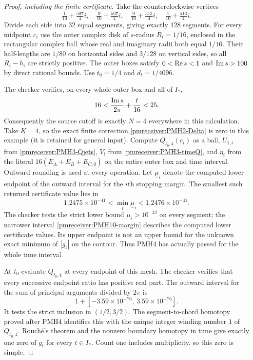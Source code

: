 \documentclass[11pt]{article}
\begin{document}
\begin{proof}[Proof, including the finite certificate]
Take the counterclockwise vertices
\[
 \tfrac1{10}+\tfrac{507}{4}i,\quad
 \tfrac9{10}+\tfrac{507}{4}i,\quad
 \tfrac9{10}+\tfrac{513}{4}i,\quad
 \tfrac1{10}+\tfrac{513}{4}i.
\]
Divide each side into 32 equal segments, giving exactly 128
segments. For every midpoint $c_i$ use the outer complex disk of
$s$-radius $R_i=1/16$, enclosed in the rectangular complex ball
whose real and imaginary radii both equal $1/16$. Their half-lengths
are $1/80$ on horizontal sides and $3/128$ on vertical sides, so
all $R_i-h_i$ are strictly positive. The outer boxes satisfy
$0<\operatorname{Re} s<1$ and $\operatorname{Im} s>100$ by direct rational bounds.
Use $t_0=1/4$ and $d_t=1/4096$.

The checker verifies, on every whole outer box and all of $I_*$,
\[
 16<\frac{\operatorname{Im} s}{2\pi}+\frac t{16}<25.
\]
Consequently the source cutoff is exactly $N=4$ everywhere in this
calculation. Take $K=4$, so the exact finite correction
\eqref{pmreceiver:PMH2-Delta} is zero in this example (it is retained for
general input). Compute $Q_{t_0,4}(c_i)$ as a ball, $U_{1,i}$ from
\eqref{pmreceiver:PMH3-Qjets}, $V_i$ from \eqref{pmreceiver:PMH3-timeQ}, and $\eta_i$
from the literal $16(E_A+E_B+E_{C,0})$ on the entire outer box and
time interval. Outward rounding is used at every operation.
Let $\underline\mu_i$ denote the computed lower endpoint of the
outward interval for the $i$th stopping margin. The smallest such
returned certificate value lies in
\begin{equation}\label{pmreceiver:PMH10-margin}
 1.2475\times10^{-41}<\min_i\underline\mu_i<1.2476\times10^{-41}.
\end{equation}
The checker tests the strict lower bound $\mu_i>10^{-42}$ on every
segment; the narrower interval \eqref{pmreceiver:PMH10-margin} describes the
computed lower certificate values. Its upper endpoint is not an
upper bound for the unknown exact minimum of $|g_t|$ on the contour.
Thus PMH4 has actually passed for the whole time interval.

At $t_0$ evaluate $Q_{t_0,4}$ at every endpoint of this mesh.
The checker verifies that every successive endpoint ratio has
positive real part. The outward interval for the sum of principal
arguments divided by $2\pi$ is
\[
 1+[-3.59\times10^{-76},\ 3.59\times10^{-76}].
\]
It tests the strict inclusion in $(1/2,3/2)$. The segment-to-chord
homotopy proved after PMH4 identifies this with the unique integer
winding number $1$ of $Q_{t_0,4}$. Rouch\'e's theorem and the
nonzero boundary homotopy in time give exactly one zero of $g_t$
for every $t\in I_*$. Count one includes multiplicity, so this zero
is simple.


\end{proof}
\end{document}
